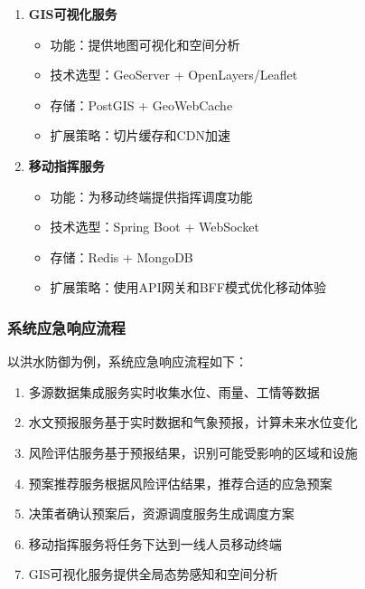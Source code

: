 \begin{enumerate}
  \begin{itemize}
  \tightlist
  \item
    功能：调度防汛物资、人员和设备
  \item
    技术选型：Spring Boot + Redis
  \item
    存储：PostgreSQL + Redis(实时状态)
  \item
    扩展策略：按行政区域分片部署
  \end{itemize}
\item
  \textbf{GIS可视化服务}

  \begin{itemize}
  \tightlist
  \item
    功能：提供地图可视化和空间分析
  \item
    技术选型：GeoServer + OpenLayers/Leaflet
  \item
    存储：PostGIS + GeoWebCache
  \item
    扩展策略：切片缓存和CDN加速
  \end{itemize}
\item
  \textbf{移动指挥服务}

  \begin{itemize}
  \tightlist
  \item
    功能：为移动终端提供指挥调度功能
  \item
    技术选型：Spring Boot + WebSocket
  \item
    存储：Redis + MongoDB
  \item
    扩展策略：使用API网关和BFF模式优化移动体验
  \end{itemize}
\end{enumerate}

\subsubsection{系统应急响应流程}\label{ux7cfbux7edfux5e94ux6025ux54cdux5e94ux6d41ux7a0b}

以洪水防御为例，系统应急响应流程如下：

\begin{enumerate}
\def\labelenumi{\arabic{enumi}.}
\tightlist
\item
  多源数据集成服务实时收集水位、雨量、工情等数据
\item
  水文预报服务基于实时数据和气象预报，计算未来水位变化
\item
  风险评估服务基于预报结果，识别可能受影响的区域和设施
\item
  预案推荐服务根据风险评估结果，推荐合适的应急预案
\item
  决策者确认预案后，资源调度服务生成调度方案
\item
  移动指挥服务将任务下达到一线人员移动终端
\item
  GIS可视化服务提供全局态势感知和空间分析
\end{enumerate}

